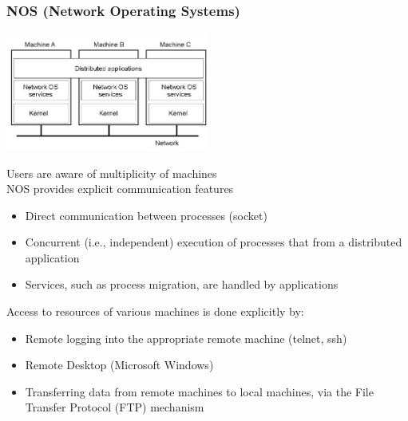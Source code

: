 \subsubsection{NOS (Network Operating Systems)}
\begin{center}
    \includegraphics[width=0.5\textwidth]{img/NOS1.jpg}
\end{center}
Users are aware of multiplicity of machines
\\NOS provides explicit communication features
\begin{itemize}
    \item Direct communication between processes (socket)
    \item Concurrent (i.e., independent) execution of processes that from a distributed application
    \item Services, such as process migration, are handled by applications
\end{itemize}
Access to resources of various machines is done explicitly by:
\begin{itemize}
    \item Remote logging into the appropriate remote machine (telnet, ssh)
    \item Remote Desktop (Microsoft Windows)   
    \item Transferring data from remote machines to local machines, via the File Transfer Protocol (FTP) mechanism
\end{itemize}

